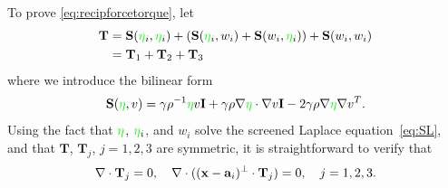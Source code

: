 \documentclass[lineno]{jfm}
\renewcommand{\aa}{\mathbf{a}}
\newcommand{\bd}{\partial}
\newcommand{\FF}{\mathbf{F}}
\newcommand{\JJ}{\mathbf{J}}
\newcommand{\nnu}{\boldsymbol{\nu}}
\newcommand{\ttau}{\boldsymbol{\tau}}
\renewcommand{\SS}{\mathbf{S}}
\newcommand{\xx}{\mathbf{x}}
\newcommand{\yy}{\mathbf{y}}
\newcommand{\pderiv}[2]{\frac{\partial #1}{\partial #2}}
\newcommand{\ReviewerTwo}[1]{\textcolor{green}{#1}}
\begin{document}

To prove \eqref{eq:recipforcetorque}, let 
\begin{align*}
  {\bf T} &=
    \SS(\ReviewerTwo{\eta}_i,\ReviewerTwo{\eta}_i) +(\SS(\ReviewerTwo{\eta}_i,w_i) +\SS(w_i,\ReviewerTwo{\eta}_i)) +\SS(w_i,w_i) \\
  &= {\bf T}_1 + {\bf T}_2 + {\bf T}_3
\end{align*}
where we introduce the bilinear form
\begin{equation}
\label{eq:Tsplit}
\SS(\ReviewerTwo{\eta},v)
=  \gamma\rho^{-1} \ReviewerTwo{\eta}v {\bf I} + \gamma\rho \nabla \ReviewerTwo{\eta} \cdot \nabla v {\bf I} - 2 \gamma \rho \nabla \ReviewerTwo{\eta} \nabla v^T.
\end{equation}
Using the fact that $\ReviewerTwo{\eta}$,  $\ReviewerTwo{\eta}_i$, and $w_i$ solve the screened Laplace
equation~\eqref{eq:SL}, and that $\mathbf{T}$, $\mathbf{T}_j$, $j = 1,
2, 3$ are symmetric, it is straightforward to verify that 
  \begin{equation}
    \label{eq:decompdivfree}
    \nabla \cdot {\bf T}_j = 0, \quad
    \nabla \cdot ((\xx-\aa_i)^{\perp} \cdot {\bf T}_j) = 0, \quad j = 1, 2, 3.
  \end{equation}
\end{document}
